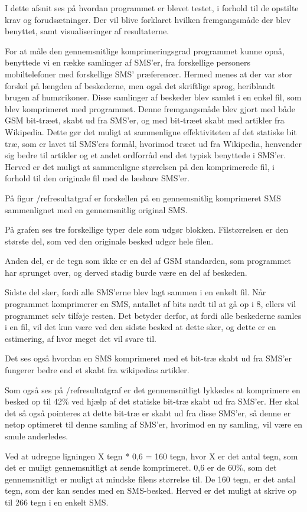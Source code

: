 I dette afsnit ses på hvordan programmet er blevet testet, i forhold til de opstilte krav og 
forudsætninger. Der vil blive forklaret hvilken fremgangsmåde der blev benyttet, samt visualiseringer af 
resultaterne.

For at måle den gennemsnitlige komprimeringsgrad programmet kunne opnå, benyttede vi en række samlinger 
af SMS’er, fra forskellige personers mobiltelefoner med forskellige SMS’ præferencer. Hermed menes at der 
var stor forskel på længden af beskederne, men også det skriftlige sprog, heriblandt brugen af 
humørikoner.
Disse samlinger af beskeder blev samlet i en enkel fil, som blev komprimeret med programmet.
Denne fremgangsmåde blev gjort med både GSM bit-træet, skabt ud fra SMS’er, og med bit-træet skabt med 
artikler fra Wikipedia. Dette gør det muligt at sammenligne effektiviteten af det statiske bit træ, som 
er lavet til SMS’ers formål, hvorimod træet ud fra Wikipedia, henvender sig bedre til artikler og et 
andet ordforråd end det typisk benyttede i SMS’er.
Herved er det muligt at sammenligne størrelsen på den komprimerede fil, i forhold til den originale fil 
med de læsbare SMS’er.

På figur /ref{resultatgraf} er forskellen på en gennemsnitlig komprimeret SMS sammenlignet med en 
gennemsnitlig original SMS.

På grafen ses tre forskellige typer dele som udgør blokken. Filstørrelsen er den største del, som ved den 
originale besked udgør hele filen.

Anden del, er de tegn som ikke er en del af GSM standarden, som programmet har sprunget over, og derved 
stadig burde være en del af beskeden.

Sidste del sker, fordi alle SMS’erne blev lagt sammen i en enkelt fil. Når programmet komprimerer en SMS, 
antallet af bits nødt til at gå op i 8, ellers vil programmet selv tilføje resten. Det betyder derfor, at 
fordi alle beskederne samles i en fil, vil det kun være ved den sidste besked at dette sker, og dette er 
en estimering, af hvor meget det vil svare til.

Det ses også hvordan en SMS komprimeret med et bit-træ skabt ud fra SMS’er fungerer bedre end et skabt 
fra wikipedias artikler.



Som også ses på /ref{resultatgraf} er det gennemsnitligt lykkedes at komprimere en besked op til 42\% ved 
hjælp af det statiske bit-træ skabt ud fra SMS’er.
Her skal det så også pointeres at dette bit-træ er skabt ud fra disse SMS’er, så denne er netop optimeret 
til denne samling af SMS’er, hvorimod en ny samling, vil være en smule anderledes.

Ved at udregne ligningen X tegn * 0,6 = 160 tegn, hvor X er det antal tegn, som det er muligt 
gennemsnitligt at sende komprimeret. 0,6 er de 60\%, som det gennemsnitligt er muligt at mindske filens 
størrelse til. De 160 tegn, er det antal tegn, som der kan sendes med en SMS-besked.
Herved er det muligt at skrive op til 266 tegn i en enkelt SMS.

